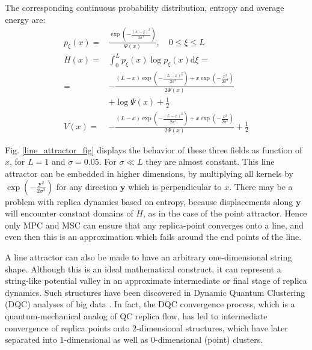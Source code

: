 \documentclass[preprint,12pt]{elsarticle}
\begin{document}
The corresponding continuous probability distribution, entropy and average energy are:
\begin{equation}\label{line_attractor_prob}
\begin{aligned}
  p_{\xi}(x)=&\frac{\exp\left( -\frac{\left( x-\xi \right)^2}{2\sigma^2} \right)}{\Psi(x)}, \quad 0\leq \xi \leq L \\
  H(x)=&\int_{0}^{L}p_{\xi}(x)\log p_{\xi}(x) \mathrm{d} \xi =\\
  =&-\frac{(L-x)\exp(-\frac{(L-x)^2}{2\sigma^2})+x\exp(-\frac{x^2}{2\sigma^2})}{2\Psi(x)}\\
  &+\log\Psi(x)+\frac{1}{2}\\
  V(x)=&-\frac{(L-x)\exp(-\frac{(L-x)^2}{2\sigma^2})+x\exp(-\frac{x^2}{2\sigma^2})}{2\Psi(x)}+\frac{1}{2}
 \end{aligned}
\end{equation}

Fig. \ref{line_attractor_fig} displays the behavior of these three fields as function of $x$, for $L=1$ and $\sigma=0.05$. For $\sigma \ll  L$ they are almost constant. This line attractor can be embedded in higher dimensions, by multiplying all kernels by $\exp \left( -\frac{\mathbf{y}^2}{2\sigma^2} \right)$ for any direction $\mathbf{y}$ which is perpendicular to $x$. There may be a problem with replica dynamics based on entropy, because displacements along $\mathbf{y}$ will encounter constant domains of $H$, as in the case of the point attractor. Hence only MPC and MSC can ensure that any replica-point converges onto a line, and even then this is an approximation which fails around the end points of the line.

A line attractor can also be made to have an arbitrary one-dimensional string shape. Although this is an ideal mathematical construct, it can represent a string-like potential valley in an approximate intermediate or final stage of replica dynamics. Such structures have been discovered in Dynamic Quantum Clustering (DQC) \cite{weinstein2009} analyses of big data \cite{weinstein2013}. In fact, the DQC convergence process, which is a quantum-mechanical analog of QC replica flow, has led to intermediate convergence of replica points onto $2$-dimensional structures, which have later separated into $1$-dimensional as well as $0$-dimensional (point) clusters.
\end{document}
